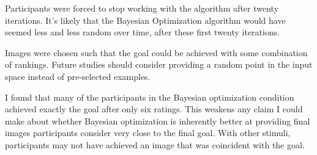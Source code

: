 Participants were forced to stop working with the algorithm after twenty iterations.
It's likely that the Bayesian Optimization algorithm would have seemed less and less random over time, after these first twenty iterations.

Images were chosen such that the goal could be achieved with some combination of rankings.
Future studies should consider providing a random point in the input space instead of pre-selected examples.

I found that many of the participants in the Bayesian optimization condition achieved exactly the goal after only six ratings.
This weakens any claim I could make about whether Bayesian optimization is inherently better at providing final images participants consider very close to the final goal.
With other stimuli, participants may not have achieved an image that was coincident with the goal.
